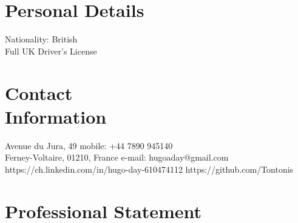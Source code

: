 \documentclass[margin,line]{resume}
\begin{document}
\begin{resume}

    \section{\mysidestyle Personal Details}
    Nationality: British \vspace{0mm}\\\vspace{-4.5mm}%
    Full UK Driver's License  \vspace{0mm}\\\vspace{-4.5mm}%


    \section{\mysidestyle Contact\\Information}
    Avenue du Jura, 49                            \hfill mobile: +44 7890 945140          \vspace{0mm}\\\vspace{0mm}%
    Ferney-Voltaire, 01210, France                          \hfill e-mail: hugoaday@gmail.com  \vspace{0mm}\\\vspace{-4.5mm} %
    https://ch.linkedin.com/in/hugo-day-610474112    \hfill https://github.com/Tontonis  \vspace{0mm}\\\vspace{-4.5mm}%

%
   \section{\mysidestyle Professional Statement}


\end{resume}
\end{document}

